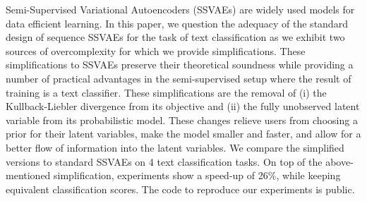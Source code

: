 Semi-Supervised Variational Autoencoders (SSVAEs) are widely used models for data efficient learning. In this paper, we question the adequacy of the standard design of sequence SSVAEs for the task of text classification as we exhibit two sources of overcomplexity for which we provide simplifications. These simplifications to SSVAEs preserve their theoretical soundness while providing a number of practical advantages in the semi-supervised setup where the result of training is a text classifier. These simplifications are the removal of (i) the Kullback-Liebler divergence from its objective and (ii) the fully unobserved latent variable from its probabilistic model. These changes relieve users from choosing a prior for their latent variables, make the model smaller and faster, and allow for a better flow of information into the latent variables. We compare the simplified versions to standard SSVAEs on 4 text classification tasks. On top of the above-mentioned simplification, experiments show a speed-up of 26\%, while keeping equivalent classification scores. The code to reproduce our experiments is public.
